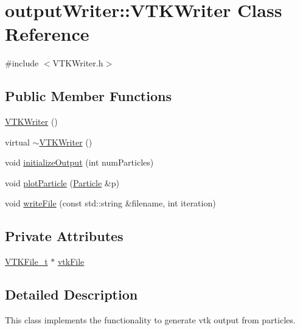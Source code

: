 \hypertarget{classoutputWriter_1_1VTKWriter}{\section{output\+Writer\+:\+:V\+T\+K\+Writer Class Reference}
\label{classoutputWriter_1_1VTKWriter}
}


{\ttfamily \#include $<$V\+T\+K\+Writer.\+h$>$}

\subsection*{Public Member Functions}
\begin{DoxyCompactItemize}
\item 
\hyperlink{classoutputWriter_1_1VTKWriter_a448311c322544e40c6e0a3c158924583}{V\+T\+K\+Writer} ()
\item 
virtual \hyperlink{classoutputWriter_1_1VTKWriter_a196a54bcfa3f93638ef292c386f91b61}{$\sim$\+V\+T\+K\+Writer} ()
\item 
void \hyperlink{classoutputWriter_1_1VTKWriter_a41cfcefce4d7eb434f1dd45f5aeb3e8f}{initialize\+Output} (int num\+Particles)
\item 
void \hyperlink{classoutputWriter_1_1VTKWriter_a6d3f50ca3ae2390055d3f9cc0ed1eb4d}{plot\+Particle} (\hyperlink{classParticle}{Particle} \&p)
\item 
void \hyperlink{classoutputWriter_1_1VTKWriter_ad0d7afb78a2027d05e9a03acde3799dd}{write\+File} (const std\+::string \&filename, int iteration)
\end{DoxyCompactItemize}
\subsection*{Private Attributes}
\begin{DoxyCompactItemize}
\item 
\hyperlink{classVTKFile__t}{V\+T\+K\+File\+\_\+t} $\ast$ \hyperlink{classoutputWriter_1_1VTKWriter_ab654ea4308b92e5dbdcd9a6833d5ed30}{vtk\+File}
\end{DoxyCompactItemize}


\subsection{Detailed Description}
This class implements the functionality to generate vtk output from particles. 


